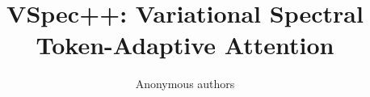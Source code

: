 \title{\textbf{VSpec++: Variational Spectral Token-Adaptive Attention}}

\author{Anonymous authors}

